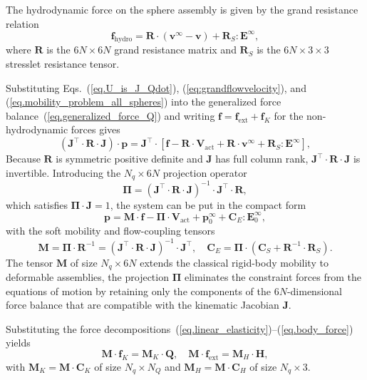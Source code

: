 \documentclass[aps,prfluids,groupedaddress]{revtex4-2}
\newcommand{\bff}{\bm{f}}
\newcommand{\bp}{\bm{p}}
\newcommand{\bv}{\bm{v}}
\newcommand{\bH}{\bm{H}}
\newcommand{\bQ}{\bm{Q}}
\newcommand{\bV}{\bm{V}}
\newcommand{\tI}{\bm{\mathit{1}}}
\newcommand{\tC}{\bm{{C}}}
\newcommand{\tE}{\bm{{E}}}
\newcommand{\tJ}{\bm{J}}
\newcommand{\tM}{\bm{{M}}}
\newcommand{\tPi}{\bm{{\Pi}}}
\newcommand{\tR}{\bm{{R}}}
\begin{document}
The hydrodynamic force on the sphere assembly is given by the grand resistance relation
\begin{equation}\label{eq.mobility_problem_all_spheres}
\bff_\mathrm{hydro} = \tR \cdot \left( \bv^\infty - \bv \right) + \tR_S : \tE^\infty,
\end{equation}
where $\tR$ is the $6N\times 6N$ grand resistance matrix and $\tR_S$ is the $6N\times 3\times 3$ stresslet resistance tensor. 

Substituting Eqs.~(\ref{eq.U_is_J_Qdot}), (\ref{eq:grandflowvelocity}), and (\ref{eq.mobility_problem_all_spheres}) into the generalized force balance~(\ref{eq.generalized_force_Q}) and writing $\bff = \bff_\mathrm{ext} + \bff_K$ for the non-hydrodynamic forces gives
\begin{equation}
\left(\tJ^\top \cdot \tR \cdot \tJ\right) \cdot \bp  =  \tJ^\top \cdot \left[\bff - \tR\cdot\bV_\mathrm{act} + \tR \cdot \bv^\infty + \tR_S : \tE^\infty \right],
\end{equation}
Because $\tR$ is symmetric positive definite and $\tJ$ has full column rank, $\tJ^\top \cdot \tR \cdot \tJ$ is invertible. Introducing the $N_q\times 6N$ projection operator
\begin{equation}\label{eq:projection}
\tPi = \left( \tJ^\top \cdot \tR \cdot \tJ \right)^{-1} \cdot \tJ^\top \cdot \tR,
\end{equation}
which satisfies $\tPi \cdot \tJ = \tI$, the system can be put in the compact form
\begin{equation}\label{eq:soft_mobility}
\bp = \tM \cdot \bff - \tPi \cdot \bV_\mathrm{act} + \bp_0^\infty + \tC_E : \tE_0^\infty,
\end{equation}
with the soft mobility and flow-coupling tensors
\begin{equation}\label{eq:soft_tensors}
\tM = \tPi \cdot \tR^{-1} = \left(\tJ^\top \cdot \tR \cdot \tJ\right)^{-1} \cdot \tJ^\top, \quad
\tC_E = \tPi \cdot (\tC_S + \tR^{-1} \cdot \tR_S).
\end{equation}
The tensor $\tM$ of size $N_q\times 6N$ extends the classical rigid-body mobility to deformable assemblies, the projection $\tPi$ eliminates the constraint forces from the equations of motion by retaining only the components of the $6N$-dimensional force balance that are compatible with the kinematic Jacobian $\tJ$.


Substituting the force decompositions~(\ref{eq.linear_elasticity})--(\ref{eq.body_force}) yields
\begin{equation}\label{eq.MK_MH}
\tM \cdot \bff_K = \tM_K \cdot \bQ, \quad \tM \cdot \bff_\mathrm{ext} = \tM_H \cdot \bH,
\end{equation}
with $\tM_K = \tM \cdot \tC_K$ of size $N_q\times N_Q$ and $\tM_H = \tM \cdot \tC_H$ of size $N_q\times 3$.
\end{document}
